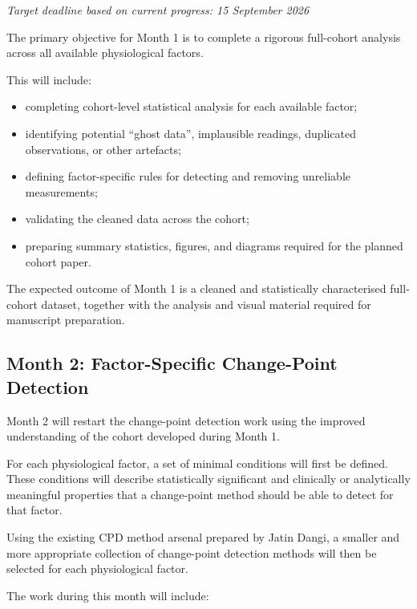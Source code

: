 \documentclass[11pt,a4paper]{article}
\begin{document}
\textit{Target deadline based on current progress: 15 September 2026}

The primary objective for Month 1 is to complete a rigorous full-cohort analysis across all available physiological factors.

This will include:

\begin{itemize}[leftmargin=1.5em]
    \item completing cohort-level statistical analysis for each available factor;
    \item identifying potential ``ghost data'', implausible readings, duplicated observations, or other artefacts;
    \item defining factor-specific rules for detecting and removing unreliable measurements;
    \item validating the cleaned data across the cohort;
    \item preparing summary statistics, figures, and diagrams required for the planned cohort paper.
\end{itemize}

The expected outcome of Month 1 is a cleaned and statistically characterised full-cohort dataset, together with the analysis and visual material required for manuscript preparation.


\subsection{Month 2: Factor-Specific Change-Point Detection}

Month 2 will restart the change-point detection work using the improved understanding of the cohort developed during Month 1.

For each physiological factor, a set of minimal conditions will first be defined. These conditions will describe statistically significant and clinically or analytically meaningful properties that a change-point method should be able to detect for that factor.

Using the existing CPD method arsenal prepared by Jatin Dangi, a smaller and more appropriate collection of change-point detection methods will then be selected for each physiological factor.

The work during this month will include:
\end{document}
